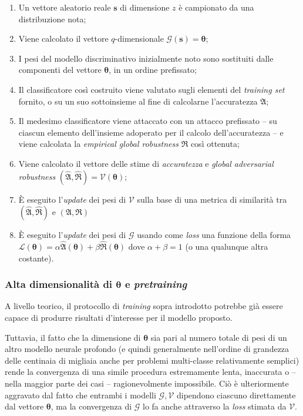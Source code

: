 \documentclass[a4paper, twoside]{article}
\begin{document}
\begin{enumerate}
	\item Un vettore aleatorio reale $\boldsymbol{s}$ di dimensione $z$ è campionato da una distribuzione nota;
	\item Viene calcolato il vettore $q$-dimensionale $\mathcal{G}(\boldsymbol{s}) = \boldsymbol{\theta}$;
	\item I pesi del modello discriminativo inizialmente noto sono sostituiti dalle componenti del vettore $\boldsymbol{\theta}$, in un ordine prefissato;
	\item Il classificatore così costruito viene valutato sugli elementi del \textit{training set} fornito, o su un suo sottoinsieme al fine di calcolarne l'accuratezza $\mathfrak{A}$;
	\item Il medesimo classificatore viene attaccato con un attacco prefissato -- su ciascun elemento dell'insieme adoperato per il calcolo dell'accuratezza -- e viene calcolata la \textit{empirical global robustness} $\mathfrak{R}$ così ottenuta;
	\item Viene calcolato il vettore delle stime di \textit{accuratezza} e \textit{global adversarial robustness} $(\hat{\mathfrak{A}},\hat{\mathfrak{R}}) = \mathcal{V}(\boldsymbol{\theta})$;
	\item È eseguito l'\textit{update} dei pesi di $\mathcal{V}$ sulla base di una metrica di similarità tra $(\hat{\mathfrak{A}},\hat{\mathfrak{R}})$ e $({\mathfrak{A}},{\mathfrak{R}})$
	\item È eseguito l'\textit{update} dei pesi di $\mathcal{G}$ usando come \textit{loss} una funzione della forma $\mathcal{L}(\boldsymbol{\theta}) =  \alpha \hat{\mathfrak{A}}(\boldsymbol{\theta}) + \beta \hat{\mathfrak{R}}(\boldsymbol{\theta})$ dove $\alpha + \beta = 1$ (o una qualunque altra costante).
\end{enumerate}

\subsubsection{Alta dimensionalità di $\boldsymbol{\theta}$ e \textit{pretraining}}

A livello teorico, il protocollo di \textit{training} sopra introdotto potrebbe già essere capace di produrre risultati d'interesse per il modello proposto.

Tuttavia, il fatto che la dimensione di $\boldsymbol{\theta}$ sia pari al numero totale di pesi di un altro modello neurale profondo (e quindi generalmente nell'ordine di grandezza delle centinaia di migliaia anche per problemi multi-classe relativamente semplici) rende la convergenza di una simile procedura estremamente lenta, inaccurata o -- nella maggior parte dei casi -- ragionevolmente impossibile. Ciò è ulteriormente aggravato dal fatto che entrambi i modelli $\mathcal{G}, \mathcal{V}$ dipendono ciascuno direttamente dal vettore $\boldsymbol{\theta}$, ma la convergenza di $\mathcal{G}$ lo fa anche attraverso la \textit{loss} stimata da $\mathcal{V}$.
\end{document}
